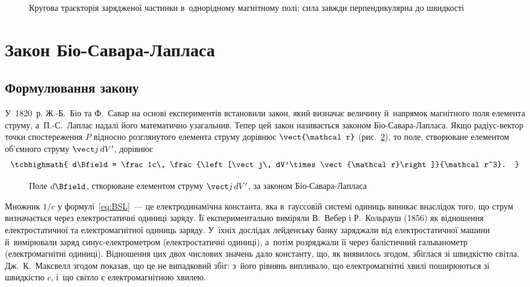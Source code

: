\begin{figure}\centering
	\caption{Кругова траєкторія зарядженої частинки в~однорідному магнітному полі: сила
		завжди перпендикулярна до швидкості\label{pic:CyclotronicTrajectory}}
\end{figure}


\section{Закон Біо-Савара-Лапласа}\hypertarget{biot-savart-law}{}


\subsection*{Формулювання закону}


У~1820~р. Ж.-Б.~Біо та Ф.~Савар на основі експериментів встановили закон, який визначає
величину й~напрямок магнітного поля елемента струму, а~П.-С.~Лаплас надалі його
математично узагальнив. Тепер цей закон називається законом Біо-Савара-Лапласа. Якщо
радіус-вектор точки спостереження $P$ відносно розглянутого елемента струму дорівнює
$\vect{\mathcal r}$ (рис.~\ref{pic:BSL}), то поле, створюване елементом об'ємного струму
$\vect j\, dV'$, дорівнює
\begin{equation}\label{eq:BSL}
	\tcbhighmath{
		d\Bfield = \frac1c\, \frac{\left[\vect j\, dV'\times\vect{\mathcal r}\right]}{\mathcal r^3}.
	}
\end{equation}

\begin{figure}\centering
	\caption{Поле $d\Bfield$, створюване елементом струму $\vect j\, dV'$, за законом
		Біо-Савара-Лапласа\label{pic:BSL}}
\end{figure}

\begin{Historical}
	Множник $1/c$ у формулі~\eqref{eq:BSL}~--- це електродинамічна константа, яка
	в~гауссовій системі одиниць виникає внаслідок того, що струм визначається через
	електростатичні одиниці заряду. Її експериментально виміряли В.~Вебер і Р.~Кольрауш
	(1856) як відношення електростатичної та електромагнітної одиниць заряду. У~їхніх
	дослідах лейденську банку заряджали від електростатичної машини й~вимірювали заряд
	синус-електрометром (електростатичні одиниці), а~потім розряджали її через балістичний
	гальванометр (електромагнітні одиниці). Відношення цих двох числових значень дало
	константу, що, як виявилось згодом, збіглася зі швидкістю світла. Дж.~К.~Максвелл
	згодом показав, що це не випадковий збіг: з~його рівнянь випливало, що електромагнітні
	хвилі поширюються зі швидкістю $c$, і~що світло є електромагнітною хвилею.
\end{Historical}

